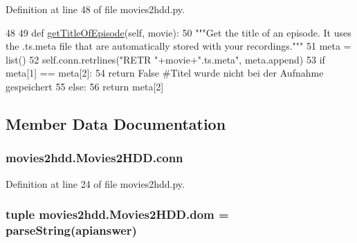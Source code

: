 Definition at line 48 of file movies2hdd.\-py.


\begin{DoxyCode}
48 
49     \textcolor{keyword}{def }\hyperlink{classmovies2hdd_1_1_movies2_h_d_d_af70b18fab503d288570e9c97e3e0cc46}{getTitleOfEpisode}(self, movie):
50         \textcolor{stringliteral}{"""Get the title of an episode. It uses the .ts.meta file that are automatically stored with your
       recordings."""}
51         meta = list()
52         self.conn.retrlines(\textcolor{stringliteral}{"RETR "}+movie+\textcolor{stringliteral}{".ts.meta"}, meta.append)
53         \textcolor{keywordflow}{if} meta[1] == meta[2]:
54             \textcolor{keywordflow}{return} \textcolor{keyword}{False} \textcolor{comment}{#Titel wurde nicht bei der Aufnahme gespeichert}
55         \textcolor{keywordflow}{else}:
56             \textcolor{keywordflow}{return} meta[2]
    
\end{DoxyCode}


\subsection{Member Data Documentation}
\hypertarget{classmovies2hdd_1_1_movies2_h_d_d_a0b93dbfa80fc06d13d8cdad9ea7bae0b}{
\subsubsection[{conn}]{\setlength{\rightskip}{0pt plus 5cm}movies2hdd.\-Movies2\-H\-D\-D.\-conn}}\label{classmovies2hdd_1_1_movies2_h_d_d_a0b93dbfa80fc06d13d8cdad9ea7bae0b}


Definition at line 24 of file movies2hdd.\-py.

\hypertarget{classmovies2hdd_1_1_movies2_h_d_d_a23cc104177423d3145c753fb423fbf7f}{
\subsubsection[{dom}]{\setlength{\rightskip}{0pt plus 5cm}tuple movies2hdd.\-Movies2\-H\-D\-D.\-dom = parse\-String(apianswer)\hspace{0.3cm}{\ttfamily [static]}}}\label{classmovies2hdd_1_1_movies2_h_d_d_a23cc104177423d3145c753fb423fbf7f}


